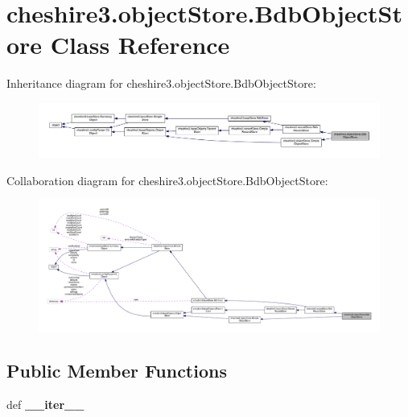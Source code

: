 \hypertarget{classcheshire3_1_1object_store_1_1_bdb_object_store}{\section{cheshire3.\-object\-Store.\-Bdb\-Object\-Store Class Reference}
\label{classcheshire3_1_1object_store_1_1_bdb_object_store}
}


Inheritance diagram for cheshire3.\-object\-Store.\-Bdb\-Object\-Store\-:
\nopagebreak
\begin{figure}[H]
\begin{center}
\leavevmode
\includegraphics[width=350pt]{classcheshire3_1_1object_store_1_1_bdb_object_store__inherit__graph}
\end{center}
\end{figure}


Collaboration diagram for cheshire3.\-object\-Store.\-Bdb\-Object\-Store\-:
\nopagebreak
\begin{figure}[H]
\begin{center}
\leavevmode
\includegraphics[width=350pt]{classcheshire3_1_1object_store_1_1_bdb_object_store__coll__graph}
\end{center}
\end{figure}
\subsection*{Public Member Functions}
\begin{DoxyCompactItemize}
\item 
\hypertarget{classcheshire3_1_1object_store_1_1_bdb_object_store_a6848ecbae199f6a6ff59ce05de69fb43}{def {\bfseries \-\_\-\-\_\-iter\-\_\-\-\_\-}}\label{classcheshire3_1_1object_store_1_1_bdb_object_store_a6848ecbae199f6a6ff59ce05de69fb43}

\end{DoxyCompactItemize}
